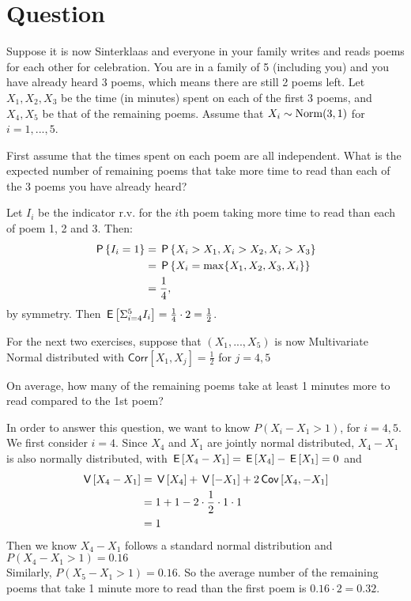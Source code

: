 \section{Question}

Suppose it is now Sinterklaas and everyone in your family writes and reads poems for each other for celebration. You are in a family of 5 (including you) and you have already heard 3 poems, which means there are still 2 poems left. Let $X_1, X_2, X_3$ be the time (in minutes) spent on each of the first 3 poems, and $X_4, X_5$ be that of the remaining poems. Assume that $X_i\sim \Norm{3, 1}$ for $i=1,...,5$.

\begin{exercise}[1.5]
 First assume that the times spent on each poem are all independent. What is the expected number of remaining poems that take more time to read than each of the 3 poems you have already heard?
\begin{solution}
 Let $I_i$ be the indicator r.v. for the $i$th poem taking more time to read than each of poem 1, 2 and 3. Then:
    \begin{align*}
        \P{I_i=1}&=\P{X_i>X_1, X_i>X_2, X_i>X_3}\\
        &=\P{X_i = \max\{X_1, X_2,X_3, X_i\}} \\
        &=\frac14,
    \end{align*}
    by symmetry.
    Then $\E{\Sigma_{i=4}^{5}I_i}=\frac{1}{4}\cdot 2=\frac12$.
\end{solution}
\end{exercise}

For the next two exercises, suppose that $(X_1,...,X_5)$ is now Multivariate Normal distributed with $\mathsf{Corr}\left[X_1,X_j\right]=\frac{1}{2}$ for $j=4, 5$


\begin{exercise}[2.5]
On average, how many of the remaining poems take at least 1 minutes more to read compared to the 1st poem? 
\begin{solution}
 In order to answer this question, we want to know $P(X_i-X_1>1)$, for $i=4, 5$. We first consider $i=4$. Since $X_4$ and $X_1$ are jointly normal distributed, $X_4-X_1$ is also normally distributed, with $\E{X_4-X_1}=\E{X_4}-\E{X_1}=0$ and 
    \begin{align*}
        \V{X_4-X_1}&=\V{X_4}+\V{-X_1}+2\cov{X_4,-X_1}\\
        &=1+1-2\cdot\frac{1}{2}\cdot 1\cdot 1\\
        &=1
    \end{align*}
    Then we know $X_4-X_1$ follows a standard normal distribution and $P(X_4-X_1>1)=0.16$\\
    Similarly,  $P(X_5-X_1>1)=0.16$. So the average number of the remaining poems that take 1 minute more to read than the first poem is $0.16\cdot2=0.32.$
 
\end{solution}
\end{exercise}




